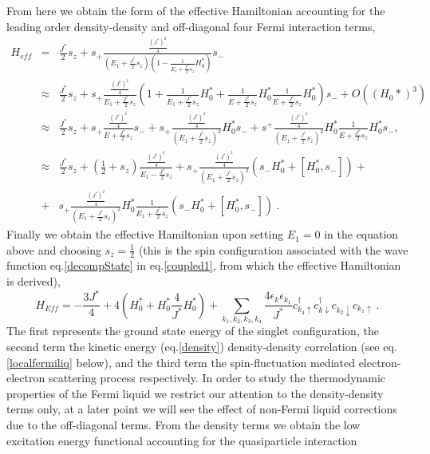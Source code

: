 \documentclass[aps,prb,preprint,groupedaddress]{revtex4-2}
\begin{document}
From here we obtain the form of the effective Hamiltonian accounting for the leading order density-density and off-diagonal four Fermi interaction terms,
\begin{eqnarray}
H_{eff}&=&\frac{J^{*}}{2}s_{z}+s_{+}\frac{\frac{(J^{*})^{2}}{4}}{(E_{1}+\frac{J^{*}}{2}s_{z})(1-\frac{1}{E_{1}+\frac{J^{*}}{2}s_{z}}H^{*}_{0})}s_{-}\nonumber\\
&\approx &\frac{J^{*}}{2}s_{z}+s_{+}\frac{\frac{(J^{*})^{2}}{4}}{E_{1}+\frac{J^{*}}{2}s_{z}}(1+\frac{1}{E_{1}+\frac{J^{*}}{2}s_{z}}H^{*}_{0}+\frac{1}{E+\frac{J^{*}}{2}s_{z}}H^{*}_{0}\frac{1}{E+\frac{J^{*}}{2}s_{z}}H^{*}_{0})s_{-}+O((H_{0}*)^{3})\nonumber\\
&\approx &\frac{J^{*}}{2}s_{z}+s_{+}\frac{\frac{(J^{*})^{2}}{4}}{E+\frac{J^{*}}{2}s_{z}}  s_{-}+ s_{+}\frac{\frac{(J^{*})^{2}}{4}}{(E_{1}+\frac{J^{*}}{2}s_{z})^{2}}H^{*}_{0}s_{-}+s^{+}\frac{\frac{(J^{*})^{2}}{4}}{(E_{1}+\frac{J^{*}}{2}s_{z})^{2}}H^{*}_{0}\frac{1}{E+\frac{J^{*}}{2}s_{z}}H^{*}_{0}s_{-}, ~~~~~\nonumber\\
&\approx &\frac{J^{*}}{2}s_{z}+(\frac{1}{2}+s_{z})\frac{\frac{(J^{*})^{2}}{4}}{E_{1}-\frac{J^{*}}{2}s_{z}}+s_{+}\frac{\frac{(J^{*})^{2}}{4}}{(E_{1}+\frac{J^{*}}{2}s_{z})^{2}}(s_{-}H^{*}_{0}+[H^{*}_{0},s_{-}])+\nonumber\\
&+&s_{+}\frac{\frac{(J^{*})^{2}}{4}}{(E_{1}+\frac{J^{*}}{2}s_{z})^{2}}H^{*}_{0}\frac{1}{E_{1}+\frac{J^{*}}{2}s_{z}}(s_{-}H^{*}_{0}+[H^{*}_{0},s_{-}])~.
\end{eqnarray}
Finally we obtain the effective Hamiltonian upon setting $E_{1}=0$ in the equation above and choosing $s_{z}=\frac{1}{2}$ (this is the spin configuration associated with the wave function eq.\eqref{decompState} in eq.\eqref{coupled1}, from which the effective Hamiltonian is derived),
\begin{equation}
H_{Eff}=-\frac{3J^{*}}{4}+4(H^{*}_{0}+H^{*}_{0}\frac{4}{J^{*}}H^{*}_{0})+\sum_{k_{1},k_{2},k_{3},k_{4}}\frac{4\epsilon_{k}\epsilon_{k_{1}}}{J^{*}}c^{\dagger}_{k_{4}\uparrow}c^{\dagger}_{k\downarrow}c_{k_{2}\downarrow}c_{k_{1}\uparrow}~.\label{eff_Ham_Kondo}
\end{equation}
The first represents the ground state energy of the singlet configuration, the second term the kinetic energy (eq.\eqref{density}) density-density correlation (see eq.\eqref{localfermiliq} below), and the third term the spin-fluctuation mediated electron-electron scattering process respectively.
\pin
In order to study the thermodynamic properties of the Fermi liquid we restrict our attention to the density-density terms only, at a later point we will see the effect of non-Fermi liquid corrections due to the off-diagonal terms. From the density terms we obtain the low excitation energy functional accounting for the quasiparticle interaction
\end{document}
